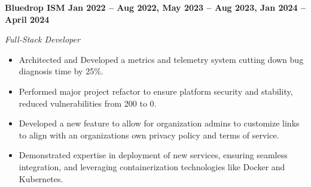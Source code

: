 \vspace{0.1cm}
\textbf{Bluedrop ISM \hfill Jan 2022 -- Aug 2022, May 2023 -- Aug 2023, Jan 2024 -- April 2024} \par
\textit{Full-Stack Developer} \par
\begin{itemize}
	\item Architected and Developed a metrics and telemetry system cutting down bug diagnosis time by 25\%.
    \item Performed major project refactor to ensure platform security and stability, reduced vulnerabilities from 200 to 0.
    \item Developed a new feature to allow for organization admins to customize links to align with an organizations own privacy policy and terms of service.
    \item Demonstrated expertise in deployment of new services, ensuring seamless integration, and leveraging containerization technologies like Docker and Kubernetes.
\end{itemize} \par